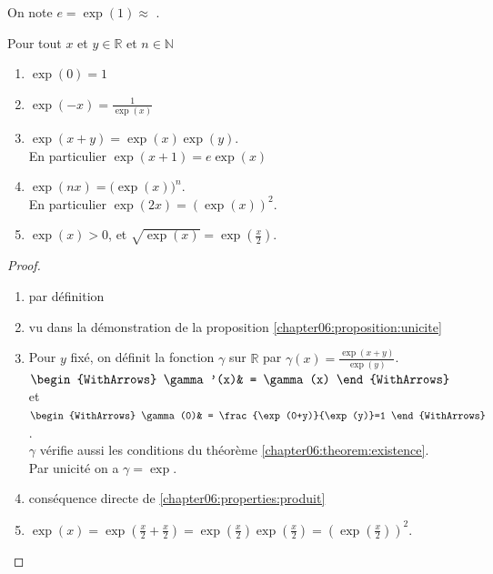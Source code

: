\documentclass[main.tex]{subfiles}
\begin{document}
\begin{definition} On note $e=\exp(1)\approx $ .
\end{definition}
\begin{properties}Pour tout $x$ et $y\in\mathbb{R}$ et $n\in\mathbb{N}$
	\begin{enumerate}[label=(\roman*),leftmargin=*]
		\item $\exp(0)=1$
		\item $\exp(-x)=\frac{1}{\exp(x)}$
		\item\label{chapter06:properties:produit}  $\exp(x+y)=\exp(x)\exp(y)$.\\
		\null\hfill  En particulier $\exp(x+1)=e\exp(x)$
		\item $\exp(nx)=\big(\exp(x)\big)^n$.\\
		\null\hfill  En particulier $\exp(2x)=(\exp(x))^2$.
		\item $\exp(x)>0$, et $\sqrt{\exp(x)}=\exp\left(\frac{x}{2}\right)$.
	\end{enumerate}
\end{properties}
\begin{proof}\hfill 
	\begin{enumerate}[label=(\roman*),leftmargin=*]
		\item par définition
		\item vu dans la démonstration de la proposition \ref{chapter06:proposition:unicite}
		\item Pour $y$ fixé, on définit la fonction $\gamma$ sur $\mathbb{R}$ par  $\gamma(x)=\frac{\exp(x+y)}{\exp(y)}$.\\
		$\begin{WithArrows}
			\gamma'(x)& = \gamma(x)  
		\end{WithArrows}$ et 
		$\begin{WithArrows}
			\gamma(0)& = \frac{\exp(0+y)}{\exp(y)}=1
		\end{WithArrows}$.\\
		$\gamma$ vérifie aussi les conditions du théorème \ref{chapter06:theorem:existence}. \\
		Par unicité on a $\gamma=\exp$.
		\item conséquence directe de \ref{chapter06:properties:produit}  
		\item $\exp(x)=\exp\left(\frac{x}{2}+\frac{x}{2}\right)= \exp\left(\frac{x}{2}\right)\exp\left(\frac{x}{2}\right)=\left(\exp\left(\frac{x}{2}\right)\right)^2$.
	\end{enumerate}
\end{proof}
\end{document}

